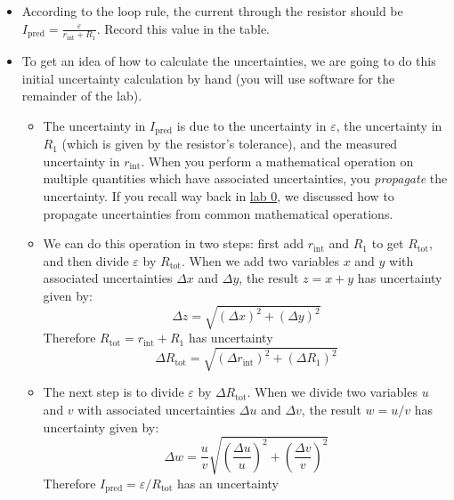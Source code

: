 \documentclass[12pt]{article}
\begin{document}
	\begin{itemize}
		\item According to the loop rule, the current through the resistor should be $I_\mathrm{pred}=\frac{\varepsilon}{r_\mathrm{int}+R_1}$. Record this value in the table.
		\item To get an idea of how to calculate the uncertainties, we are going to do this initial uncertainty calculation by hand (you will use software for the remainder of the lab).
		\begin{itemize}
			\item The uncertainty in $I_\mathrm{pred}$ is due to the uncertainty in $\varepsilon$, the uncertainty in $R_1$ (which is given by the resistor's tolerance), and the measured uncertainty in $r_\mathrm{int}$. When you perform a mathematical operation on multiple quantities which have associated uncertainties, you \textit{propagate} the uncertainty. If you recall way back in \href{https://docs.google.com/presentation/d/1Fo2NTuZi30aOQy9B81vZXLq0mfbW5UzA/edit?usp=sharing&ouid=110312813035722732105&rtpof=true&sd=true}{lab 0}, we discussed how to propagate uncertainties from common mathematical operations. 
			\item We can do this operation in two steps: first add $r_\mathrm{int}$ and $R_1$ to get $R_\mathrm{tot}$, and then divide $\varepsilon$ by $R_\mathrm{tot}$. When we add two variables $x$ and $y$ with associated uncertainties $\Delta x$ and $\Delta y$, the result $z=x+y$ has uncertainty given by:
			\begin{equation*}
				\Delta z = \sqrt{\left(\Delta x\right)^2 + \left(\Delta y\right)^2}
			\end{equation*}
		Therefore $R_\mathrm{tot}=r_\mathrm{int} + R_1$ has uncertainty 
		\begin{equation*}
					\Delta R_\mathrm{tot}=\sqrt{\left(\Delta r_\mathrm{int}\right)^2+\left(\Delta R_1\right)^2}
		\end{equation*}
		\item The next step is to divide $\varepsilon$ by $\Delta R_\mathrm{tot}$. When we divide two variables $u$ and $v$ with associated uncertainties $\Delta u$ and $\Delta v$, the result $w=u/v$ has uncertainty given by:
		\begin{equation*}
			\Delta w = \frac{u}{v}\sqrt{\left(\frac{\Delta u}{u}\right)^2 + \left(\frac{\Delta v}{v}\right)^2}
		\end{equation*}
		Therefore $I_\mathrm{pred}=\varepsilon/R_\mathrm{tot}$ has an uncertainty
		\begin{equation*}

\end{equation*}
\end{itemize}
\end{itemize}
\end{document}
